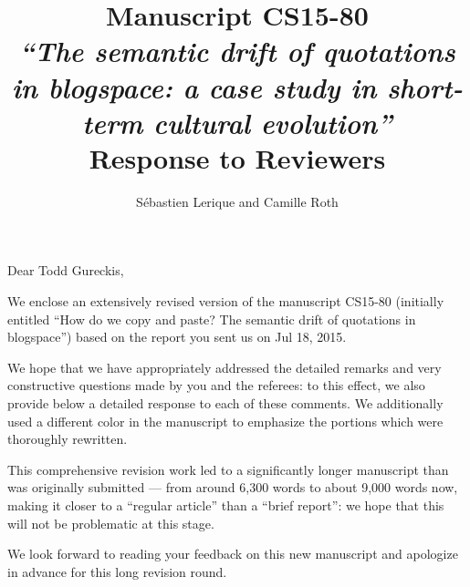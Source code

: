 \documentclass[a4paper,10pt]{article}
\title{Manuscript CS15-80\medskip\\
{\Large\em``The semantic drift of quotations in blogspace: a case study in short-term cultural evolution''}
\bigskip\\Response to Reviewers
}
\author{Sébastien Lerique and Camille Roth}
\begin{document}
\maketitle

\makeatletter
\renewcommand{\subsection}{\clearpage\@startsection{section}{1}{0mm}
{\baselineskip}{\baselineskip\medskip\hrule\medskip}{\raggedright\Large\bf~\textcolor{MidnightBlue}}}
\makeatother


\newcommand{\critique}[1]{\begin{quote}#1\end{quote}}
\newcommand{\answer}[1]{{\setlength{\parindent}{0pt}\par\color{blue} #1}}
\newcommand{\tb}[1]{\textcolor{blue}{#1}}
\newcommand{\answerok}[1]{{\setlength{\parindent}{0pt}\par\color{MidnightBlue} #1}}
\newcommand{\unclear}[1]{\textcolor{red}{\sf [C: #1]}}

\vspace{3cm}
Dear Todd Gureckis,

\bigskip
We enclose an extensively revised version of the manuscript CS15-80 (initially entitled ``How do we copy and paste? The semantic drift of quotations in blogspace'') based on the report you sent us on Jul 18, 2015.

\medskip
We hope that we have appropriately addressed the detailed remarks and very constructive questions made by you and the referees: to this effect, we also provide below a detailed response to each of these comments.  We additionally used a different color in the manuscript to emphasize the portions which were thoroughly rewritten.

\medskip
This comprehensive revision work led to a significantly longer manuscript than was originally submitted --- from around 6,300 words to about 9,000 words now, making it closer to a ``regular article'' than a ``brief report'': we hope that this will not be problematic at this stage.

\medskip
We look forward to reading your feedback on this new manuscript and apologize in advance for this long revision round.
\end{document}
